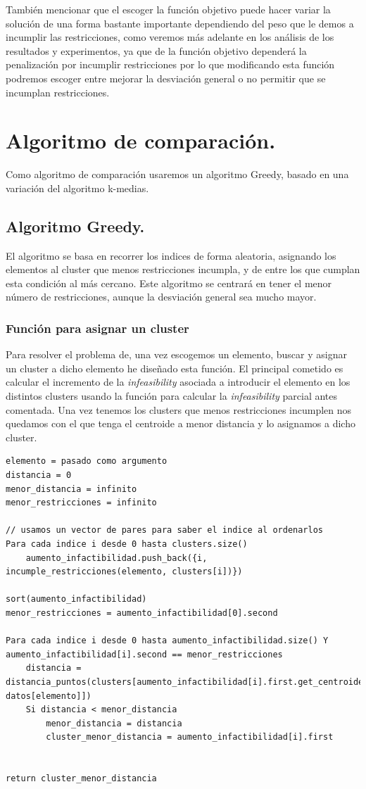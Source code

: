 \documentclass[12pt, spanish]{article}
\begin{document}
También mencionar que el escoger la función objetivo puede hacer variar la solución de una forma bastante importante dependiendo del peso que le demos a incumplir las restricciones, como veremos más adelante en los análisis de los resultados y experimentos, ya que de la función objetivo dependerá la penalización por incumplir restricciones por lo que modificando esta función podremos escoger entre mejorar la desviación general o no permitir que se incumplan restricciones.

\section{Algoritmo de comparación.}

Como algoritmo de comparación usaremos un algoritmo Greedy, basado en una variación del algoritmo k-medias.

\subsection{Algoritmo Greedy.}

El algoritmo se basa en recorrer los indices de forma aleatoria, asignando los elementos al cluster que menos restricciones incumpla, y de entre los que cumplan esta condición al más cercano. Este algoritmo se centrará en tener el menor número de restricciones, aunque la desviación general sea mucho mayor.

\subsubsection{Función para asignar un cluster}

Para resolver el problema de, una vez escogemos un elemento, buscar y asignar un cluster a dicho elemento he diseñado esta función. El principal cometido es calcular el incremento de la \textit{infeasibility} asociada a introducir el elemento en los distintos clusters usando la función para calcular la \textit{infeasibility} parcial antes comentada. Una vez tenemos los clusters que menos restricciones incumplen nos quedamos con el que tenga el centroide a menor distancia y lo asignamos a dicho cluster.


\begin{lstlisting}
elemento = pasado como argumento
distancia = 0
menor_distancia = infinito
menor_restricciones = infinito

// usamos un vector de pares para saber el indice al ordenarlos
Para cada indice i desde 0 hasta clusters.size()
	aumento_infactibilidad.push_back({i, incumple_restricciones(elemento, clusters[i])})

sort(aumento_infactibilidad)
menor_restricciones = aumento_infactibilidad[0].second

Para cada indice i desde 0 hasta aumento_infactibilidad.size() Y aumento_infactibilidad[i].second == menor_restricciones
	distancia = distancia_puntos(clusters[aumento_infactibilidad[i].first.get_centroide(), datos[elemento]])
	Si distancia < menor_distancia
		menor_distancia = distancia
		cluster_menor_distancia = aumento_infactibilidad[i].first


return cluster_menor_distancia
\end{lstlisting}
\end{document}
